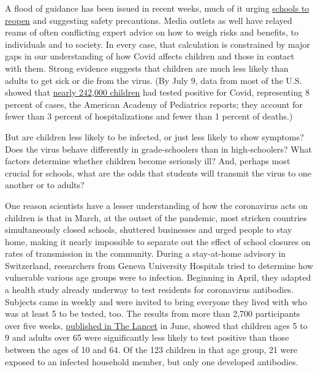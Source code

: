 A flood of guidance has been issued in recent weeks, much of it urging
\href{https://www.nytimes3xbfgragh.onion/2020/08/03/business/how-schools-reopen.html}{schools
to reopen} and suggesting safety precautions. Media outlets as well have
relayed reams of often conflicting expert advice on how to weigh risks
and benefits, to individuals and to society. In every case, that
calculation is constrained by major gaps in our understanding of how
Covid affects children and those in contact with them. Strong evidence
suggests that children are much less likely than adults to get sick or
die from the virus. (By July 9, data from most of the U.S. showed that
\href{https://services.aap.org/en/pages/2019-novel-coronavirus-covid-19-infections/children-and-covid-19-state-level-data-report/}{nearly
242,000 children} had tested positive for Covid, representing 8 percent
of cases, the American Academy of Pediatrics reports; they account for
fewer than 3 percent of hospitalizations and fewer than 1 percent of
deaths.)

But are children less likely to be infected, or just less likely to show
symptoms? Does the virus behave differently in grade-schoolers than in
high-schoolers? What factors determine whether children become seriously
ill? And, perhaps most crucial for schools, what are the odds that
students will transmit the virus to one another or to adults?

One reason scientists have a lesser understanding of how the coronavirus
acts on children is that in March, at the outset of the pandemic, most
stricken countries simultaneously closed schools, shuttered businesses
and urged people to stay home, making it nearly impossible to separate
out the effect of school closures on rates of transmission in the
community. During a stay-at-home advisory in Switzerland, researchers
from Geneva University Hospitals tried to determine how vulnerable
various age groups were to infection. Beginning in April, they adapted a
health study already underway to test residents for coronavirus
antibodies. Subjects came in weekly and were invited to bring everyone
they lived with who was at least 5 to be tested, too. The results from
more than 2,700 participants over five weeks,
\href{https://www.thelancet.com/journals/lancet/article/PIIS0140-6736(20)31304-0/fulltext}{published
in The Lancet} in June, showed that children ages 5 to 9 and adults over
65 were significantly less likely to test positive than those between
the ages of 10 and 64. Of the 123 children in that age group, 21 were
exposed to an infected household member, but only one developed
antibodies.

